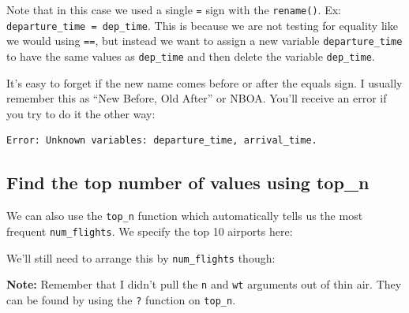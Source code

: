 \documentclass[12pt,]{krantz}
\makeatletter
\newenvironment{Shaded}{\begin{snugshade}}{\end{snugshade}}
\newcommand{\KeywordTok}[1]{\textcolor[rgb]{0.27,0.27,0.27}{\textbf{#1}}}
\newcommand{\DataTypeTok}[1]{\textcolor[rgb]{0.27,0.27,0.27}{#1}}
\newcommand{\DecValTok}[1]{\textcolor[rgb]{0.06,0.06,0.06}{#1}}
\newcommand{\StringTok}[1]{\textcolor[rgb]{0.5,0.5,0.5}{#1}}
\newcommand{\OperatorTok}[1]{\textcolor[rgb]{0.43,0.43,0.43}{\textbf{#1}}}
\newcommand{\NormalTok}[1]{#1}
\newenvironment{kframe}{%
\medskip{}
\setlength{\fboxsep}{.8em}
 \def\at@end@of@kframe{}%
 \ifinner\ifhmode%
  \def\at@end@of@kframe{\end{minipage}}%
  \begin{minipage}{\columnwidth}%
 \fi\fi%
 \def\FrameCommand##1{\hskip\@totalleftmargin \hskip-\fboxsep
 \colorbox{shadecolor}{##1}\hskip-\fboxsep
     \hskip-\linewidth \hskip-\@totalleftmargin \hskip\columnwidth}%
 \MakeFramed {\advance\hsize-\width
   \@totalleftmargin\z@ \linewidth\hsize
   \@setminipage}}%
 {\par\unskip\endMakeFramed%
 \at@end@of@kframe}
\renewenvironment{Shaded}{\begin{kframe}}{\end{kframe}}
\makeatother
\begin{document}
Note that in this case we used a single \texttt{=} sign with the
\texttt{rename()}. Ex: \texttt{departure\_time\ =\ dep\_time}. This is
because we are not testing for equality like we would using \texttt{==},
but instead we want to assign a new variable \texttt{departure\_time} to
have the same values as \texttt{dep\_time} and then delete the variable
\texttt{dep\_time}.

It's easy to forget if the new name comes before or after the equals
sign. I usually remember this as ``New Before, Old After'' or NBOA.
You'll receive an error if you try to do it the other way:

\begin{verbatim}
Error: Unknown variables: departure_time, arrival_time.
\end{verbatim}

\subsection{Find the top number of values using
top\_n}\label{find-the-top-number-of-values-using-top_n}

We can also use the \texttt{top\_n} function which automatically tells
us the most frequent \texttt{num\_flights}. We specify the top 10
airports here:

\begin{Shaded}
\end{Shaded}

We'll still need to arrange this by \texttt{num\_flights} though:

\begin{Shaded}
\end{Shaded}

\textbf{Note:} Remember that I didn't pull the \texttt{n} and
\texttt{wt} arguments out of thin air. They can be found by using the
\texttt{?} function on \texttt{top\_n}.
\end{document}
